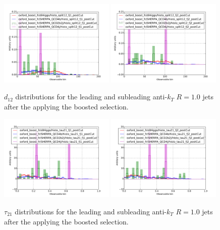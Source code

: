 \documentclass[12pt]{article}
\begin{document}
\begin{figure}[h]
\begin{center}
\includegraphics[width=0.49\textwidth]{plots/histo_split12_fj1.pdf}
\includegraphics[width=0.49\textwidth]{plots/histo_split12_fj2.pdf}
\caption{$d_{12}$ distributions for the leading and subleading anti-$k_T$ $R=1.0$ jets after the applying the boosted selection.}
\label{fig:split12_fj_boosted_post}
\end{center}
\end{figure}

\begin{figure}[h]
\begin{center}
\includegraphics[width=0.49\textwidth]{plots/histo_tau21_fj1.pdf}
\includegraphics[width=0.49\textwidth]{plots/histo_tau21_fj2.pdf}
\caption{$\tau_{21}$ distributions for the leading and subleading anti-$k_T$ $R=1.0$ jets after the applying the boosted selection.}
\label{fig:tau21_fj_boosted_post}
\end{center}
\end{figure}
\end{document}
